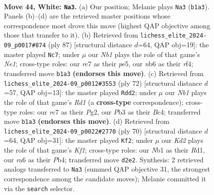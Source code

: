\documentclass[11pt]{article}
\begin{document}
\clearpage

\begin{figure}[p]\centering
\begin{subfigure}{0.46\textwidth}\centering
\resizebox{\linewidth}{!}{%
\newchessgame
\chessboard[
  setfen={5k2/2r2p1p/rn4p1/p3p1P1/P3P3/1P4RP/3K2P1/RN6 w - - 2 44},
  showmover=false,
  pgfstyle=straightmove, color=movearrow, markmove={b1-a3}
]}
\caption{}
\end{subfigure}\hfill
\begin{subfigure}{0.46\textwidth}\centering
\resizebox{\linewidth}{!}{%
\newchessgame
\chessboard[
  setfen={4n3/6k1/1p2r2p/p1p1P3/3p1RP1/1P3N1P/1PP4K/8 b - - 0 44},
  showmover=false,
  pgfstyle=straightmove, color=movearrow, markmove={e8-c7}
]}
\caption{}
\end{subfigure}
\\[4pt]
\begin{subfigure}{0.46\textwidth}\centering
\resizebox{\linewidth}{!}{%
\newchessgame
\chessboard[
  setfen={1r2b3/1r4pk/2p2p2/2P1pP2/2B1P2p/7P/1PR3P1/3R3K w - - 0 37},
  showmover=false,
  pgfstyle=straightmove, color=movearrow, markmove={d1-d2}
]}
\caption{}
\end{subfigure}\hfill
\begin{subfigure}{0.46\textwidth}\centering
\resizebox{\linewidth}{!}{%
\newchessgame
\chessboard[
  setfen={6r1/p2pk3/4p1np/R3Ppr1/1PP2p2/3N1P2/P6P/3R1K2 w - - 3 36},
  showmover=false,
  pgfstyle=straightmove, color=movearrow, markmove={f1-f2}
]}
\caption{}
\end{subfigure}
\caption{\textbf{Move 44, White: \texttt{Na3}.} (a) Our position; Melanie plays \texttt{Na3} (\texttt{b1a3}). Panels (b)--(d) are the retrieved master positions whose correspondence most drove this move (highest QAP objective among those that transfer to it). (b) Retrieved from \texttt{lichess\_elite\_2024-09\_p0017\#874} (ply 87) [structural distance $d$=64, QAP obj=19]: the master played \texttt{Nc7}; under $\mu$ our \emph{Nb1} plays the role of that game's \emph{Ne1}; cross-type roles: our \emph{r}c7 as their \emph{p}e5, our \emph{n}b6 as their \emph{r}f4; transferred move \texttt{b1a3} \textbf{(endorses this move)}. (c) Retrieved from \texttt{lichess\_elite\_2024-09\_p0012\#3553} (ply 72) [structural distance $d$=57, QAP obj=13]: the master played \texttt{Rdd2}; under $\mu$ our \emph{Nb1} plays the role of that game's \emph{Rd1} (a \textbf{cross-type} correspondence); cross-type roles: our \emph{r}c7 as their \emph{P}g2, our \emph{P}b3 as their \emph{B}c4; transferred move \texttt{b1a3} \textbf{(endorses this move)}. (d) Retrieved from \texttt{lichess\_elite\_2024-09\_p0022\#2770} (ply 70) [structural distance $d$=64, QAP obj=31]: the master played \texttt{Kf2}; under $\mu$ our \emph{Kd2} plays the role of that game's \emph{Kf1}; cross-type roles: our \emph{N}b1 as their \emph{R}d1, our \emph{r}a6 as their \emph{P}b4; transferred move \texttt{d2e2}. Synthesis: 2 retrieved analogs transferred to \texttt{Na3} (summed QAP objective 31, the strongest correspondence among the candidate moves); Melanie committed it via the \texttt{search} selector.}
\label{fig:thought-m86}
\end{figure}
\end{document}
